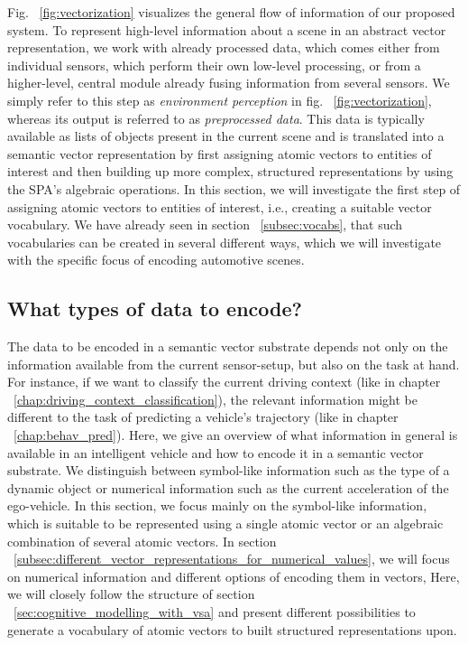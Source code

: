 Fig. ~\ref{fig:vectorization} visualizes the general flow of information of our proposed system.
To represent high-level information about a scene in an abstract vector representation, we work with already processed data, which comes either from individual sensors, which perform their own low-level processing, or from a higher-level, central module already fusing information from several sensors.
We simply refer to this step as \emph{environment perception} in fig. ~\ref{fig:vectorization}, whereas its output is referred to as \emph{preprocessed data}.
This data is typically available as lists of objects present in the current scene and is translated into a semantic vector representation by first assigning atomic vectors to entities of interest and then building up more complex, structured representations by using the \ac{SPA}'s algebraic operations.
In this section, we will investigate the first step of assigning atomic vectors to entities of interest, i.e., creating a suitable vector vocabulary.
We have already seen in section ~\ref{subsec:vocabs}, that such vocabularies can be created in several different ways, which we will investigate with the specific focus of encoding automotive scenes.

\subsection{What types of data to encode?}%
\label{subsec:what_types_of_data_to_encode_}

The data to be encoded in a semantic vector substrate depends not only on the information available from the current sensor-setup, but also on the task at hand.
For instance, if we want to classify the current driving context (like in chapter ~\ref{chap:driving_context_classification}), the relevant information might be different to the task of predicting a vehicle's trajectory (like in chapter ~\ref{chap:behav_pred}).
Here, we give an overview of what information in general is available in an intelligent vehicle and how to encode it in a semantic vector substrate.
We distinguish between symbol-like information such as the type of a dynamic object or numerical information such as the current acceleration of the ego-vehicle.
In this section, we focus mainly on the symbol-like information, which is suitable to be represented using a single atomic vector or an algebraic combination of several atomic vectors.
In section ~\ref{subsec:different_vector_representations_for_numerical_values}, we will focus on numerical information and different options of encoding them in vectors,
Here, we will closely follow the structure of section ~\ref{sec:cognitive_modelling_with_vsa} and present different possibilities to generate a vocabulary of atomic vectors to built structured representations upon.

